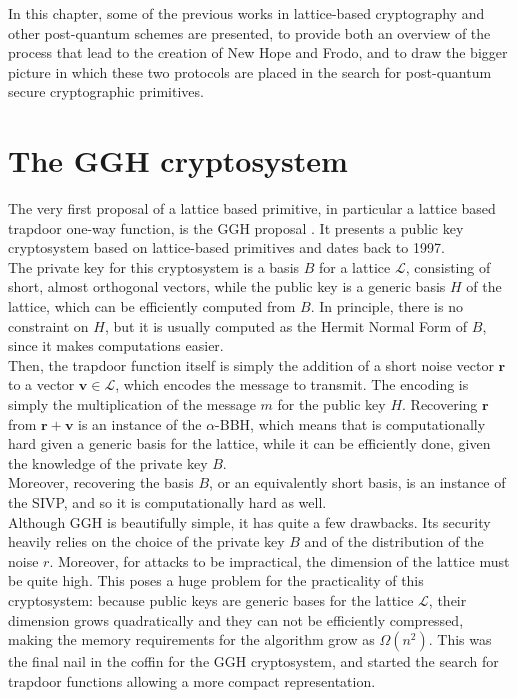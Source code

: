 In this chapter, some of the previous works in lattice-based cryptography and other post-quantum schemes are presented, to provide both an overview of the process that lead to the creation of New Hope and Frodo, and to draw the bigger picture in which these two protocols are placed in the search for post-quantum secure cryptographic primitives.

\section{The GGH cryptosystem}
The very first proposal of a lattice based primitive, in particular a lattice based trapdoor one-way function, is the GGH proposal \cite{GGH}. It presents a public key cryptosystem based on lattice-based primitives and dates back to 1997.\\
The private key for this cryptosystem is a basis $B$ for a lattice $\mathscr{L}$, consisting of short, almost orthogonal vectors, while the public key is a generic basis $H$ of the lattice, which can be efficiently computed from $B$. In principle, there is no constraint on $H$, but it is usually computed as the Hermit Normal Form of $B$, since it makes computations easier.\\
Then, the trapdoor function itself is simply the addition of a short noise vector $\mathbf{r}$ to a vector $\mathbf{v}\in\mathscr{L}$, which encodes the message to transmit. The encoding is simply the multiplication of the message $m$ for the public key $H$. Recovering $\mathbf{r}$ from $\mathbf{r}+\mathbf{v}$ is an instance of the $\alpha$-BBH, which means that is computationally hard given a generic basis for the lattice, while it can be efficiently done, given the knowledge of the private key $B$.\\
Moreover, recovering the basis $B$, or an equivalently short basis, is an instance of the SIVP, and so it is computationally hard as well.\\
Although GGH is beautifully simple, it has quite a few drawbacks. Its security heavily relies on the choice of the private key $B$ and of the distribution of the noise $r$. Moreover, for attacks to be impractical, the dimension of the lattice must be quite high. This poses a huge problem for the practicality of this cryptosystem: because public keys are generic bases for the lattice $\mathscr{L}$, their dimension grows quadratically and they can not be efficiently compressed, making the memory requirements for the algorithm grow as $\Omega(n^2)$. This was the final nail in the coffin for the GGH cryptosystem, and started the search for trapdoor functions allowing a more compact representation.

